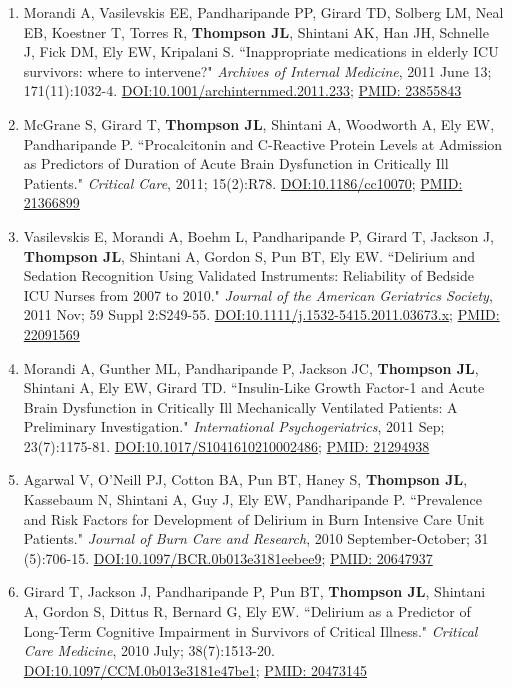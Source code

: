 \documentclass[5pt]{article}
\begin{document}
\begin{enumerate}
\item Morandi A, Vasilevskis EE, Pandharipande PP, Girard TD, Solberg LM, Neal EB, Koestner T, Torres R, \textbf{Thompson JL}, Shintani AK, Han JH, Schnelle J, Fick DM, Ely EW, Kripalani S. ``Inappropriate medications in elderly ICU survivors: where to intervene?" \emph{Archives of Internal Medicine}, 2011 June 13; 171(11):1032-4. \href{https://doi.org/10.1001/archinternmed.2011.233}{DOI:10.1001/archinternmed.2011.233}; \href{https://www.ncbi.nlm.nih.gov/pubmed/23855843}{PMID: 23855843}
\item McGrane S, Girard T, \textbf{Thompson JL}, Shintani A, Woodworth A, Ely EW, Pandharipande P. ``Procalcitonin and C-Reactive Protein Levels at Admission as Predictors of Duration of Acute Brain Dysfunction in Critically Ill Patients." \emph{Critical Care}, 2011; 15(2):R78. \href{https://doi.org/10.1186/cc10070}{DOI:10.1186/cc10070}; \href{https://www.ncbi.nlm.nih.gov/pubmed/21366899}{PMID: 21366899}
\item Vasilevskis E, Morandi A, Boehm L, Pandharipande P, Girard T, Jackson J, \textbf{Thompson JL}, Shintani A, Gordon S, Pun BT, Ely EW. ``Delirium and Sedation Recognition Using Validated Instruments: Reliability of Bedside ICU Nurses from 2007 to 2010." \emph{Journal of the American Geriatrics Society}, 2011 Nov; 59 Suppl 2:S249-55. \href{https://doi.org/10.1111/j.1532-5415.2011.03673.x}{DOI:10.1111/j.1532-5415.2011.03673.x}; \href{https://www.ncbi.nlm.nih.gov/pubmed/22091569}{PMID: 22091569}
\item Morandi A, Gunther ML, Pandharipande P, Jackson JC, \textbf{Thompson JL}, Shintani A, Ely EW, Girard TD. ``Insulin-Like Growth Factor-1 and Acute Brain Dysfunction in Critically Ill Mechanically Ventilated Patients: A Preliminary Investigation." \emph{International Psychogeriatrics}, 2011 Sep; 23(7):1175-81. \href{https://doi.org/10.1017/S1041610210002486}{DOI:10.1017/S1041610210002486}; \href{https://www.ncbi.nlm.nih.gov/pubmed/21294938}{PMID: 21294938}
\item Agarwal V, O'Neill PJ, Cotton BA, Pun BT, Haney S, \textbf{Thompson JL}, Kassebaum N, Shintani A, Guy J, Ely EW, Pandharipande P. ``Prevalence and Risk Factors for Development of Delirium in Burn Intensive Care Unit Patients." \emph{Journal of Burn Care and Research}, 2010 September-October; 31 (5):706-15. \href{https://doi.org/10.1097/BCR.0b013e3181eebee9}{DOI:10.1097/BCR.0b013e3181eebee9}; \href{https://www.ncbi.nlm.nih.gov/pubmed/20647937}{PMID: 20647937}
\item Girard T, Jackson J, Pandharipande P, Pun BT, \textbf{Thompson JL}, Shintani A, Gordon S, Dittus R, Bernard G, Ely EW. ``Delirium as a Predictor of Long-Term Cognitive Impairment in Survivors of Critical Illness." \emph{Critical Care Medicine}, 2010 July; 38(7):1513-20. \href{https://doi.org/10.1097/CCM.0b013e3181e47be1}{DOI:10.1097/CCM.0b013e3181e47be1}; \href{https://www.ncbi.nlm.nih.gov/pubmed/20473145}{PMID: 20473145}

\end{enumerate}
\end{document}
